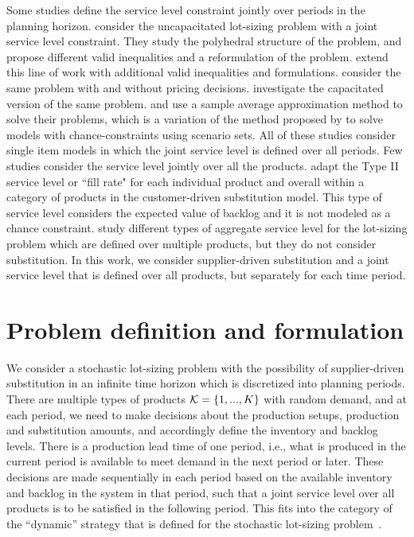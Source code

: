 \documentclass[msom]{oo}
\begin{document}
Some studies define the service level constraint jointly over periods in the planning horizon. \cite{liu2018polyhedral} consider the uncapacitated lot-sizing problem with a joint service level constraint. They study the polyhedral structure of the problem, and propose different valid inequalities and a reformulation of the  problem. \cite{zhangetal2022} extend this line of work with additional valid inequalities and formulations. \cite{jiang2017production} consider the same problem with and without pricing decisions. \cite{gicquel2018joint} investigate the capacitated version of the same problem. \cite{jiang2017production} and \cite{gicquel2018joint} use a sample average approximation method to solve their problems, which is a variation of the 
method proposed by \cite{luedtke2008sample} to solve models with chance-constraints using scenario sets. All of these studies consider single item models in which the joint service level is defined over all periods. Few studies consider the service level jointly over all the products. \cite{akccaycategory} adapt the Type II service level or ``fill rate" for each individual product and overall within a category of products in the customer-driven substitution model. This type of service level considers the expected value of backlog and it is not modeled as a chance constraint. \cite{sereshti2020value} study different types of aggregate service level for the lot-sizing problem which are defined over multiple products, but they do not consider substitution. In this work, we consider supplier-driven substitution and a joint service level that is defined over all products, but separately for each time period.

\section{Problem definition and formulation}
\label{sec:form}

We consider a stochastic lot-sizing problem with the possibility of supplier-driven substitution in an infinite time horizon which is discretized into planning periods. %
There are multiple types of products  $\mathcal{K}= \{1,...,K\}$ with random demand, and at each period, we need to make decisions about the production setups, production and substitution amounts, and accordingly define the inventory and backlog levels. There is a production lead time of one period, i.e., what is produced in the current period is available to meet demand in the next period or later. 
These decisions are made sequentially in each period based on the available inventory and backlog in the system in that period, such that a joint service level over all products is to be satisfied in the following period. This fits into the category of the  ``dynamic'' strategy that is defined for the stochastic lot-sizing problem~\citep{bookbinder1988strategies}. 
\end{document}
